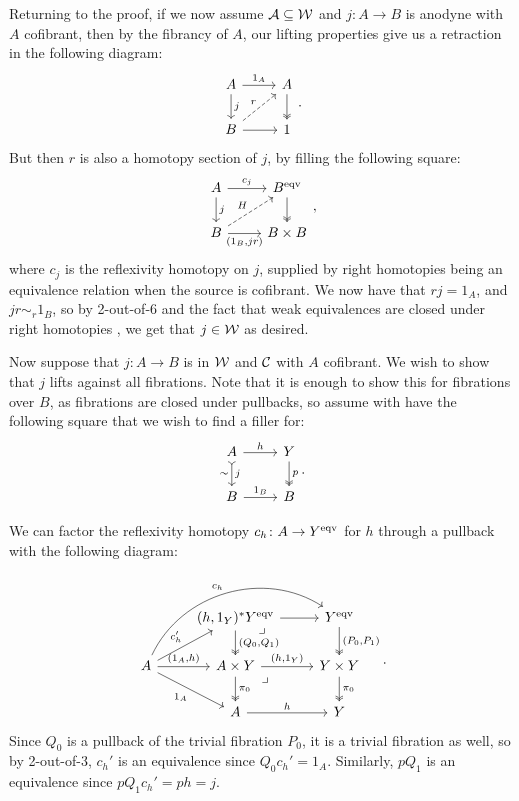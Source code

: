\documentclass{amsart}
\begin{document}
\begin{sketch}
    Returning to the proof, if we now assume $\mathcal{A}\subseteq\mathcal{W}$ and $j\colon A\to B$ is anodyne with $A$ cofibrant, then by the fibrancy of $A$, our lifting properties give us a retraction in the following diagram:
    \[\begin{tikzcd}
        A \arrow[r, "1_A"] \arrow[d, "j"] & A \arrow[d, two heads]\\
        B \arrow[ur, dashed, "r"] \arrow[r] & 1
    \end{tikzcd}.\]
    But then $r$ is also a homotopy section of $j$, by filling the following square:
    \[\begin{tikzcd}
        A \arrow[r, "c_j"] \arrow[d, "j"] & B^{\eqv} \arrow[d, two heads]\\
        B \arrow[ur, dashed, "H"] \arrow[r, "{(1_B, jr)}"'] & B\times B
    \end{tikzcd},\]
    where $c_j$ is the reflexivity homotopy on $j$, supplied by right homotopies being an equivalence relation when the source is cofibrant. We now have that $rj=1_A$, and $jr\sim_r1_B$, so by 2-out-of-6 and the fact that weak equivalences are closed under right homotopies \cite[Prop. 6.5]{KL18}, we get that $j\in\mathcal{W}$ as desired.

    Now suppose that $j\colon A\to B$ is in $\mathcal{W}$ and $\mathcal{C}$ with $A$ cofibrant. We wish to show that $j$ lifts against all fibrations. Note that it is enough to show this for fibrations over $B$, as fibrations are closed under pullbacks, so assume with have the following square that we wish to find a filler for:
    \[\begin{tikzcd}
        A \arrow[r, "h"] \arrow[d, tail, "j", "\sim"'] & Y \arrow[d, two heads, "p"]\\
        B \arrow[r, "1_B"] & B
    \end{tikzcd}.\]

    We can factor the reflexivity homotopy $c_h\colon A\to Y^{\operatorname{eqv}}$ for $h$ through a pullback with the following diagram:
    \[\begin{tikzcd}
            & {(h,1_Y)^*Y^{\eqv}} \arrow[r] \arrow[d, two heads, "{(Q_0,Q_1)}"] \arrow[dr, phantom, "\lrcorner", pos=0] & Y^{\eqv} \arrow[d, two heads, "{(P_0,P_1)}"]\\
        A \arrow[ur, "c_h'"] \arrow[r, "{(1_A,h)}"] \arrow[dr, "1_A"'] \arrow[urr, bend left=49, "c_h"] & A\times Y \arrow[r, "{(h,1_Y)}"] \arrow[d, two heads, "\pi_0"] \arrow[dr, phantom, "\lrcorner", pos=0.1] & Y\times Y \arrow[d, two heads, "\pi_0"]\\
            & A \arrow[r, "h"] & Y
    \end{tikzcd}.\]
    Since $Q_0$ is a pullback of the trivial fibration $P_0$, it is a trivial fibration as well, so by 2-out-of-3, $c_h'$ is an equivalence since $Q_0c_h'=1_A$. Similarly, $pQ_1$ is an equivalence since $pQ_1c_h'=ph=j$.


\end{sketch}
\end{document}

